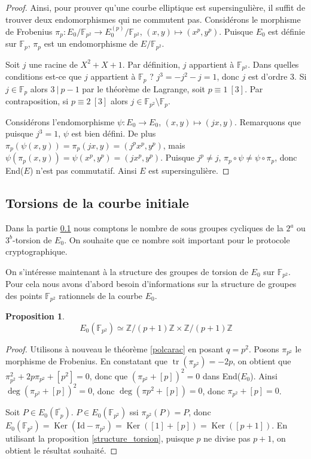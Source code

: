 \documentclass{article}
\theoremstyle{plain}%
\newtheorem{prop}[thm]{Proposition}
\theoremstyle{definition}%
\newcommand{\F}{\mathbb{F}}
\newcommand{\Z}{\mathbb{Z}}
\DeclareMathOperator{\tr}{tr}
\DeclareMathOperator{\Ker}{Ker}
\begin{document}
\begin{proof}
Ainsi, pour prouver qu'une courbe elliptique est supersingulière, il suffit de trouver deux endomorphismes qui ne commutent pas.
Considérons le morphisme de Frobenius $\pi_p : E_0/\F_{p^2} \to E_0^{(p)}/\F_{p^2}$, $(x, y) \mapsto (x^p, y^p)$. 
Puisque $E_0$ est définie sur $\F_{p}$, $\pi_p$ est un endomorphisme de $E/\F_{p^2}$.

Soit $j$ une racine de $X^2 + X + 1$. 
Par définition, $j$ appartient à $\F_{p^2}$. 
Dans quelles conditions est-ce que $j$ appartient à $\F_{p}$ ? 
$j^3 = -j^2 -j = 1$, donc $j$ est d'ordre $3$. 
Si $j\in \F_{p}$ alors $3\ |\ p-1$ par le théorème de Lagrange, soit $p\equiv 1\ [3]$. 
Par contraposition, si $p \equiv 2\ [3]$ alors $j\in\F_{p^2}\setminus\F_{p}$.

Considérons l'endomorphisme $\psi : E_0 \to E_0$, $(x, y) \mapsto (jx, y)$. 
Remarquons que puisque $j^3 = 1$, $\psi$ est bien défini.
De plus $\pi_p(\psi(x, y)) = \pi_p(jx, y) = (j^px^p, y^p)$, mais $\psi(\pi_p(x, y)) = \psi(x^p, y^p) = (jx^p, y^p)$. 
Puisque $j^p\neq j$, $\pi_p \circ \psi \neq \psi \circ \pi_p$, donc End($E$) n'est pas commutatif.
Ainsi $E$ est supersingulière.
\end{proof}


\subsection{Torsions de la courbe initiale}
\label{torsion_init}
 Dans la partie \ref{torsion_init} nous comptons le nombre de sous groupes cycliques de la $2^a$ ou $3^b$-torsion de $E_0$. On souhaite que ce nombre soit important pour le protocole cryptographique.

On s'intéresse maintenant à la structure des groupes de torsion de $E_0$ sur $\F_{p^2}$. Pour cela nous avons d'abord besoin d'informations sur la structure de groupes des points $\F_{p^2}$ rationnels de la courbe $E_0$. 

\begin{prop}
  $$E_0(\F_{p^2}) \simeq \Z/(p+1)\Z \times \Z/(p+1)\Z$$
\end{prop}

\begin{proof}
  Utilisons à nouveau le théorème \ref{polcarac} en posant $q = p^2$. 
  Posons $\pi_{p^2}$ le morphisme de Frobenius.
  En constatant que $\tr(\pi_{p^2}) = -2p$, on obtient que $\pi_{p^2}^2 + 2p\pi_{p^2} + [p^2] = 0$, donc que $\left( \pi_{p^2} + [p] \right) ^2 = 0$ dans End($E_0$). 
  Ainsi $\deg(\pi_{p^2} + [p])^2 = 0$, donc $\deg(\pi{p^2} + [p]) = 0$, donc $\pi_{p^2} + [p] = 0$.

  Soit $P\in E_0(\overline{\F_{p}})$. $P \in E_0(\F_{p^2})$ ssi $\pi_{p^2}(P) = P$, donc $E_0(\F_{p^2}) = \Ker(\text{Id} - \pi_{p^2}) = \Ker([1] + [p]) = \Ker([p+1])$.
  En utilisant la proposition \ref{structure_torsion}, puisque $p$ ne divise pas $p+1$, on obtient le résultat souhaité.
\end{proof}
\end{document}
